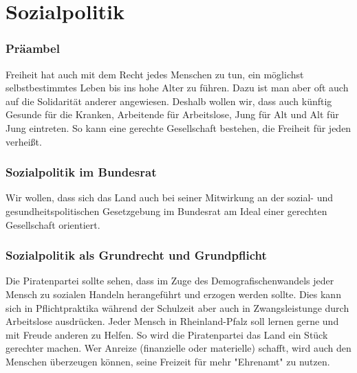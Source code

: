 \section{Sozialpolitik}


\subsubsection{Präambel}
\abstimmung
Freiheit hat auch mit dem Recht jedes Menschen zu tun, ein möglichst selbstbestimmtes Leben bis ins hohe Alter zu führen. Dazu ist man aber oft auch auf die Solidarität anderer angewiesen. Deshalb wollen wir, dass auch künftig Gesunde für die Kranken, Arbeitende für Arbeitslose, Jung für Alt und Alt für Jung eintreten. So kann eine gerechte Gesellschaft bestehen, die Freiheit für jeden verheißt.
 
\subsubsection{Sozialpolitik im Bundesrat}
\abstimmung
Wir wollen, dass sich das Land auch bei seiner Mitwirkung an der sozial- und gesundheitspolitischen Gesetzgebung im Bundesrat am Ideal einer gerechten Gesellschaft orientiert.
 

\subsubsection{Sozialpolitik als Grundrecht und Grundpflicht}
\abstimmung
Die Piratenpartei sollte sehen, dass im Zuge des Demografischenwandels jeder Mensch zu sozialen Handeln herangeführt und erzogen werden sollte. Dies kann sich in Pflichtpraktika während der Schulzeit aber auch in Zwangsleistunge durch Arbeitslose ausdrücken. Jeder Mensch in Rheinland-Pfalz soll lernen gerne und mit Freude anderen zu Helfen. So wird die Piratenpartei das Land ein Stück gerechter machen. Wer Anreize (finanzielle oder materielle) schafft, wird auch den Menschen überzeugen können, seine Freizeit für mehr "Ehrenamt" zu nutzen.
 
\newpage
{}

